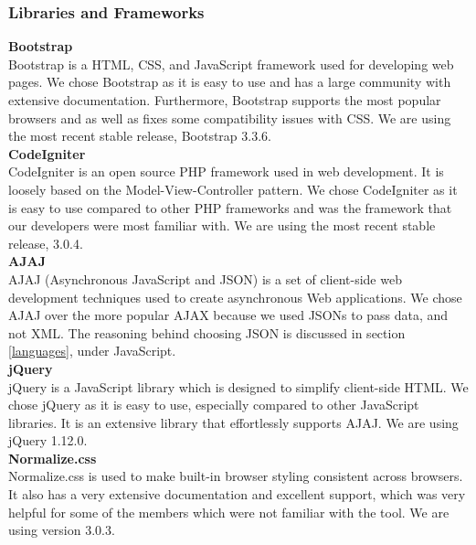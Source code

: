 \documentclass[12pt]{article}
\begin{document}
\subsubsection{Libraries and Frameworks} \label{framworks}
\textbf{Bootstrap}\\
Bootstrap is a HTML, CSS, and JavaScript framework used for developing web pages. We chose Bootstrap as it is easy to use and has a large community with extensive documentation. Furthermore, Bootstrap supports the most popular browsers and as well as fixes some compatibility issues with CSS. We are using the most recent stable release, Bootstrap 3.3.6.
\\
%
\textbf{CodeIgniter} \\
CodeIgniter is an open source PHP framework used in web development. It is loosely based on the Model-View-Controller pattern. We chose CodeIgniter as it is easy to use compared to other PHP frameworks and was the framework that our developers were most familiar with. We are using the most recent stable release, 3.0.4.
\\
%
\textbf{AJAJ}\\
AJAJ (Asynchronous JavaScript and JSON) is a set of client-side web development techniques used to create asynchronous Web applications. We chose AJAJ over the more popular AJAX because we used JSONs to pass data, and not XML. The reasoning behind choosing JSON is discussed in section \ref{languages}, under JavaScript.
\\
%
\textbf{jQuery}\\
jQuery is a JavaScript library which is designed to simplify client-side HTML. We chose jQuery as it is easy to use, especially compared to other JavaScript libraries. It is an extensive library that effortlessly supports AJAJ. We are using jQuery 1.12.0.
\\
%
\textbf{Normalize.css}\\
Normalize.css is used to make built-in browser styling consistent across browsers. It also has a very extensive documentation and excellent support, which was very helpful for some of the members which were not familiar with the tool. We are using version 3.0.3.
%
%
%
\end{document}
